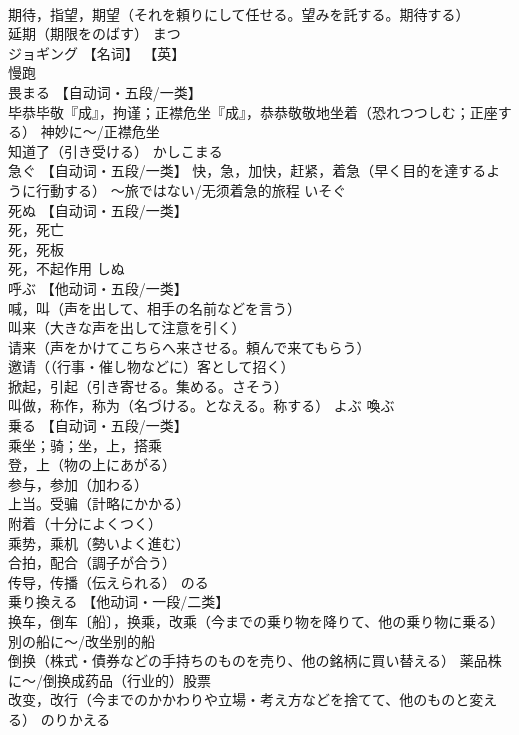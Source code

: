 \documentclass[8pt]{extreport}
\begin{document}
\begin{CJK}{UTF8}{min}
\\	期待，指望，期望（それを頼りにして任せる。望みを託する。期待する） 
\\	延期（期限をのばす）	まつ	
\\	ジョギング	【名词】 【英】
\\	慢跑		
\\	畏まる	【自动词・五段/一类】 
\\	毕恭毕敬『成』，拘谨；正襟危坐『成』，恭恭敬敬地坐着（恐れつつしむ；正座する） 神妙に～/正襟危坐 
\\	知道了（引き受ける）	かしこまる	
\\	急ぐ	【自动词・五段/一类】 快，急，加快，赶紧，着急（早く目的を達するように行動する） ～旅ではない/无须着急的旅程	いそぐ	
\\	死ぬ	【自动词・五段/一类】 
\\	死，死亡 
\\	死，死板 
\\	死，不起作用	しぬ	
\\	呼ぶ	【他动词・五段/一类】 
\\	喊，叫（声を出して、相手の名前などを言う） 
\\	叫来（大きな声を出して注意を引く） 
\\	请来（声をかけてこちらへ来させる。頼んで来てもらう） 
\\	邀请（（行事・催し物などに）客として招く） 
\\	掀起，引起（引き寄せる。集める。さそう） 
\\	叫做，称作，称为（名づける。となえる。称する）	よぶ	喚ぶ
\\	乗る	【自动词・五段/一类】 
\\	乘坐；骑；坐，上，搭乘 
\\	登，上（物の上にあがる） 
\\	参与，参加（加わる） 
\\	上当。受骗（計略にかかる） 
\\	附着（十分によくつく） 
\\	乘势，乘机（勢いよく進む） 
\\	合拍，配合（調子が合う） 
\\	传导，传播（伝えられる）	のる	
\\	乗り換える	【他动词・一段/二类】 
\\	换车，倒车〔船〕，换乘，改乘（今までの乗り物を降りて、他の乗り物に乗る） 別の船に～/改坐别的船 
\\	倒换（株式・債券などの手持ちのものを売り、他の銘柄に買い替える） 薬品株に～/倒换成药品（行业的）股票 
\\	改变，改行（今までのかかわりや立場・考え方などを捨てて、他のものと変える）	のりかえる	

\end{CJK}
\end{document}
